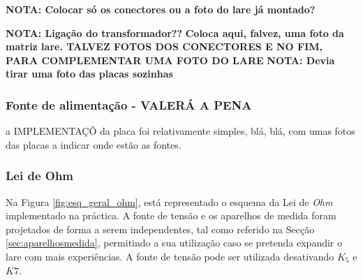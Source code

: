\textbf{NOTA: Colocar só os conectores ou a foto do lare já montado?}

\textbf{NOTA: Ligação do transformador??}
\textbf{Coloca aqui, falvez, uma foto da matriz lare. TALVEZ FOTOS DOS CONECTORES E NO FIM, PARA COMPLEMENTAR UMA FOTO DO LARE}
\textbf{NOTA: Devia tirar uma foto das placas sozinhas}

\subsubsection{Fonte de alimentação - VALERÁ A PENA}
\label{sec:alimentacaoplacas}
a IMPLEMENTAÇÕ da placa foi relativamente simples, blá, blá, com umas fotos das placas a indicar onde estão as fontes.

\subsubsection{Lei de Ohm}
\label{sec:lei_ohm}
Na Figura \ref{fig:esq_geral_ohm}, está representado o esquema da Lei de \textit{Ohm} implementado na práctica. A fonte de tensão e os aparelhos de medida foram projetados de forma a serem independentes, tal como referido na Secção \ref{sec:aparelhosmedida}, permitindo a sua utilização caso se pretenda expandir o \acrshort{lare} com mais experiências. A fonte de tensão pode ser utilizada desativando $K_{5}$ e $K7$.

